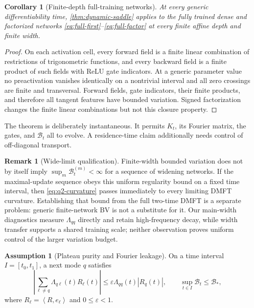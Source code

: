 \documentclass[11pt]{article}
\newcommand{\1}{\mathbf 1}
\newcommand{\ip}[2]{\left\langle #1,#2\right\rangle}
\newcommand{\cB}{\mathcal B}
\theoremstyle{plain}
\newtheorem{corollary}[theorem]{Corollary}
\theoremstyle{definition}
\newtheorem{assumption}[theorem]{Assumption}
\newtheorem{remark}[theorem]{Remark}
\begin{document}
\begin{corollary}[Finite-depth full-training networks]
\label{cor:full-depth}
At every generic differentiability time, \cref{thm:dynamic-saddle} applies
to the fully trained dense and factorized networks
\eqref{eq:full-first}--\eqref{eq:full-factor} at every finite affine depth
and finite width.
\end{corollary}

\begin{proof}
On each activation cell, every forward field is a finite linear combination
of restrictions of trigonometric functions, and every backward field is a
finite product of such fields with ReLU gate indicators.  At a generic
parameter value no preactivation vanishes identically on a nontrivial
interval and all zero crossings are finite and transversal.  Forward
fields, gate indicators, their finite products, and therefore all tangent
features have bounded variation.  Signed factorization changes the finite
linear combinations but not this closure property.
\end{proof}

The theorem is deliberately instantaneous.  It permits \(K_t\), its
Fourier matrix, the gates, and \(\cB_t\) all to evolve.  A residence-time
claim additionally needs control of off-diagonal transport.

\begin{remark}[Wide-limit qualification]
Finite-width bounded variation does not by itself imply
\(\sup_m\cB_t^{(m)}<\infty\) for a sequence of widening networks.  If the
maximal-update sequence obeys this uniform regularity bound on a fixed time
interval, then \eqref{eq:q2-curvature} passes immediately to every limiting
DMFT curvature.  Establishing that bound from the full two-time DMFT is a
separate problem: generic finite-network BV is not a substitute for it.  Our
main-width diagnostics measure \(\Lambda_{qq}\) directly and retain
high-frequency decay, while width transfer supports a shared training scale;
neither observation proves uniform control of the larger variation budget.
\end{remark}

\begin{assumption}[Plateau purity and Fourier leakage]
\label{ass:leakage}
On a time interval \(I=[t_0,t_1]\), a next mode \(q\) satisfies
\begin{equation}
 \left|\sum_{\ell\neq q}\Lambda_{q\ell}(t)R_\ell(t)\right|
 \leq\varepsilon\Lambda_{qq}(t)|R_q(t)|,
 \qquad
 \sup_{t\in I}\cB_t\leq\cB_*,
 \label{eq:leakage}
\end{equation}
where \(R_\ell=\ip{R}{e_\ell}\) and \(0\leq\varepsilon<1\).
\end{assumption}
\end{document}
